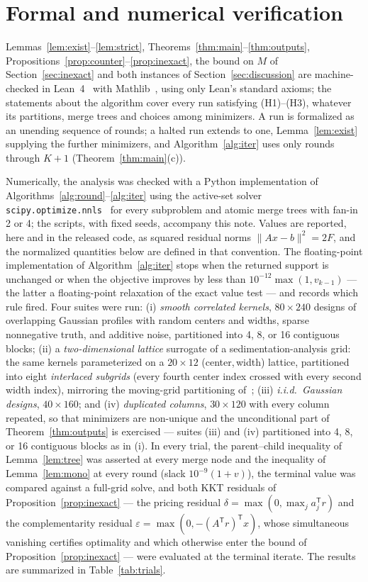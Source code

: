 \documentclass[pdflatex,sn-mathphys-num]{sn-jnl}
\theoremstyle{thmstyleone}
\theoremstyle{thmstyletwo}
\newcommand{\T}{{\mathsf T}}
\begin{document}
\section{Formal and numerical verification}\label{sec:numerics}

Lemmas~\ref{lem:exist}--\ref{lem:strict},
Theorems~\ref{thm:main}--\ref{thm:outputs},
Propositions~\ref{prop:counter}--\ref{prop:inexact}, the bound on $M$ of
Section~\ref{sec:inexact} and both instances of
Section~\ref{sec:discussion} are machine-checked in
Lean~4~\cite{demoura2021} with Mathlib~\cite{mathlib2020}, using only
Lean's standard axioms; the statements about the algorithm cover every
run satisfying (H1)--(H3), whatever its partitions, merge trees and
choices among minimizers. A run is formalized as an unending sequence of
rounds; a halted run extends to one, Lemma~\ref{lem:exist} supplying
the further minimizers, and Algorithm~\ref{alg:iter} uses only rounds
through $K{+}1$ (Theorem~\ref{thm:main}(c)).

Numerically, the analysis was checked with a Python implementation of
Algorithms~\ref{alg:round}--\ref{alg:iter} using the active-set solver
\texttt{scipy.optimize.nnls}~\cite{virtanen2020} for every subproblem
and atomic merge trees with fan-in 2 or 4; the scripts, with fixed
seeds, accompany this note. Values are reported, here and in the
released code, as squared residual norms $\lVert Ax-b\rVert^2=2F$, and
the normalized quantities below are defined in that convention. The
floating-point implementation of Algorithm~\ref{alg:iter} stops when
the returned support is unchanged or when the objective improves by
less than $10^{-12}\max(1,v_{k-1})$ --- the latter a floating-point
relaxation of the exact value test --- and records which rule fired. Four suites were run: (i) \emph{smooth correlated
kernels}, $80\times240$ designs of overlapping Gaussian profiles with
random centers and widths, sparse nonnegative truth, and additive
noise, partitioned into 4, 8, or 16 contiguous blocks; (ii) a \emph{two-dimensional
lattice} surrogate of a sedimentation-analysis grid: the same kernels
parameterized on a $20\times12$ (center,\,width) lattice, partitioned
into eight \emph{interlaced subgrids} (every fourth center index
crossed with every second width index), mirroring the moving-grid
partitioning of~\cite{brookes2006}; (iii) \emph{i.i.d.\ Gaussian
designs}, $40\times160$; and (iv) \emph{duplicated columns},
$30\times120$ with every column repeated, so that minimizers are
non-unique and the unconditional part of Theorem~\ref{thm:outputs} is
exercised --- suites (iii) and (iv) partitioned into 4, 8, or 16
contiguous blocks as in (i). In every trial, the parent--child inequality of
Lemma~\ref{lem:tree} was asserted at every merge node and the
inequality of Lemma~\ref{lem:mono} at every round (slack
$10^{-9}(1+v)$), the terminal value was compared against a full-grid solve,
and both KKT residuals of Proposition~\ref{prop:inexact} --- the
pricing residual $\delta=\max(0,\max_j a_j^{\T}r)$ and the
complementarity residual $\varepsilon=\max(0,-(A^{\T}r)^{\T}x)$, whose
simultaneous vanishing certifies optimality and which otherwise enter
the bound of Proposition~\ref{prop:inexact} --- were evaluated at the
terminal iterate. The results are summarized in
Table~\ref{tab:trials}.
\end{document}
